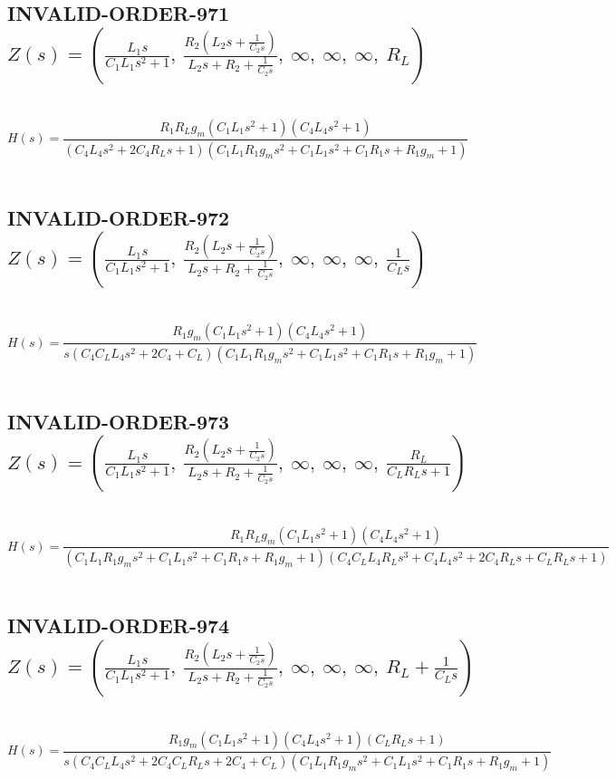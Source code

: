 \documentclass{article}
\begin{document}
\subsection{INVALID-ORDER-971 $Z(s) = \left( \frac{L_{1} s}{C_{1} L_{1} s^{2} + 1}, \  \frac{R_{2} \left(L_{2} s + \frac{1}{C_{2} s}\right)}{L_{2} s + R_{2} + \frac{1}{C_{2} s}}, \  \infty, \  \infty, \  \infty, \  R_{L}\right)$ } \ 
\textbf{\[H(s) = \frac{R_{1} R_{L} g_{m} \left(C_{1} L_{1} s^{2} + 1\right) \left(C_{4} L_{4} s^{2} + 1\right)}{\left(C_{4} L_{4} s^{2} + 2 C_{4} R_{L} s + 1\right) \left(C_{1} L_{1} R_{1} g_{m} s^{2} + C_{1} L_{1} s^{2} + C_{1} R_{1} s + R_{1} g_{m} + 1\right)}\] } \ 
\subsection{INVALID-ORDER-972 $Z(s) = \left( \frac{L_{1} s}{C_{1} L_{1} s^{2} + 1}, \  \frac{R_{2} \left(L_{2} s + \frac{1}{C_{2} s}\right)}{L_{2} s + R_{2} + \frac{1}{C_{2} s}}, \  \infty, \  \infty, \  \infty, \  \frac{1}{C_{L} s}\right)$ } \ 
\textbf{\[H(s) = \frac{R_{1} g_{m} \left(C_{1} L_{1} s^{2} + 1\right) \left(C_{4} L_{4} s^{2} + 1\right)}{s \left(C_{4} C_{L} L_{4} s^{2} + 2 C_{4} + C_{L}\right) \left(C_{1} L_{1} R_{1} g_{m} s^{2} + C_{1} L_{1} s^{2} + C_{1} R_{1} s + R_{1} g_{m} + 1\right)}\] } \ 
\subsection{INVALID-ORDER-973 $Z(s) = \left( \frac{L_{1} s}{C_{1} L_{1} s^{2} + 1}, \  \frac{R_{2} \left(L_{2} s + \frac{1}{C_{2} s}\right)}{L_{2} s + R_{2} + \frac{1}{C_{2} s}}, \  \infty, \  \infty, \  \infty, \  \frac{R_{L}}{C_{L} R_{L} s + 1}\right)$ } \ 
\textbf{\[H(s) = \frac{R_{1} R_{L} g_{m} \left(C_{1} L_{1} s^{2} + 1\right) \left(C_{4} L_{4} s^{2} + 1\right)}{\left(C_{1} L_{1} R_{1} g_{m} s^{2} + C_{1} L_{1} s^{2} + C_{1} R_{1} s + R_{1} g_{m} + 1\right) \left(C_{4} C_{L} L_{4} R_{L} s^{3} + C_{4} L_{4} s^{2} + 2 C_{4} R_{L} s + C_{L} R_{L} s + 1\right)}\] } \ 
\subsection{INVALID-ORDER-974 $Z(s) = \left( \frac{L_{1} s}{C_{1} L_{1} s^{2} + 1}, \  \frac{R_{2} \left(L_{2} s + \frac{1}{C_{2} s}\right)}{L_{2} s + R_{2} + \frac{1}{C_{2} s}}, \  \infty, \  \infty, \  \infty, \  R_{L} + \frac{1}{C_{L} s}\right)$ } \ 
\textbf{\[H(s) = \frac{R_{1} g_{m} \left(C_{1} L_{1} s^{2} + 1\right) \left(C_{4} L_{4} s^{2} + 1\right) \left(C_{L} R_{L} s + 1\right)}{s \left(C_{4} C_{L} L_{4} s^{2} + 2 C_{4} C_{L} R_{L} s + 2 C_{4} + C_{L}\right) \left(C_{1} L_{1} R_{1} g_{m} s^{2} + C_{1} L_{1} s^{2} + C_{1} R_{1} s + R_{1} g_{m} + 1\right)}\] } \ 
\end{document}
